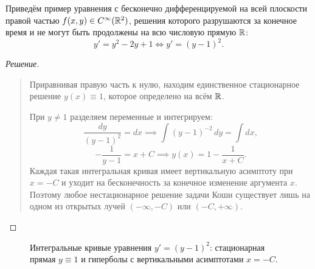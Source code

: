 \begin{example}
    Приведём пример уравнения с бесконечно дифференцируемой на всей плоскости
    правой частью $f(x, y) \in C^\infty(\mathbb{R}^2)$, решения которого разрушаются
    за конечное время и не могут быть продолжены на всю числовую прямую $\mathbb{R}$:
    \begin{equation} \label{eq:l3_riccati_ex}
        y' = y^2 - 2y + 1 \iff y' = (y - 1)^2. \tag{4}
    \end{equation}

    \begin{proof}[Решение]~\\
        \begin{quote}
            Приравнивая правую часть к нулю, находим единственное стационарное
            решение $y(x) \equiv 1$, которое определено на всём $\mathbb{R}$.

            При $y \neq 1$ разделяем переменные и интегрируем:
            \[
                \frac{dy}{(y - 1)^2} = dx \implies
                \int (y - 1)^{-2} \, dy = \int dx,
            \]
            \[
                -\frac{1}{y - 1} = x + C \implies
                y(x) = 1 - \frac{1}{x + C}.
            \]
            Каждая такая интегральная кривая имеет вертикальную асимптоту при
            $x = -C$ и уходит на бесконечность за конечное изменение аргумента
            $x$. Поэтому любое нестационарное решение задачи Коши существует
            лишь на одном из открытых лучей $(-\infty, -C)$ или $(-C, +\infty)$.
        \end{quote}
    \end{proof}
\end{example}

\begin{figure}[H]
    \centering
    \caption{Интегральные кривые уравнения $y' = (y - 1)^2$: стационарная
    прямая $y \equiv 1$ и гиперболы с вертикальными асимптотами $x = -C$.}
\end{figure}

